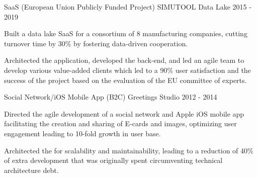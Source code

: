 \begin{cventries}

  \cventry
    {SaaS (European Union Publicly Funded Project)} %
    {SIMUTOOL Data Lake} %
    {2015 - 2019} %
    {} %
    {
          \begin{cvitems} %
			\item {Built a data lake SaaS for a consortium of 8 manufacturing companies, cutting turnover time by 30\% by fostering data-driven cooperation.} 
			\item {Architected the application, developed the back-end, and led an agile team to develop various value-added clients which led to a 90\% user satisfaction and the success of the project based on the evaluation of the EU committee of experts.}
	      \end{cvitems}
    }
    



  \cventry
    {Social Network/iOS Mobile App (B2C)} %
    {Greetings Studio} %
    {2012 - 2014} %
    {} %
    {
          \begin{cvitems} %
				\item {Directed the agile development of a social network and Apple iOS mobile app facilitating the creation and sharing of E-cards and images, optimizing user engagement leading to 10-fold growth in user base.}
				\item {Architected the for scalability and maintainability, leading to a reduction of 40\% of extra development that was originally spent circumventing technical architecture debt.}
	      \end{cvitems}
    }
    
    



\end{cventries}
